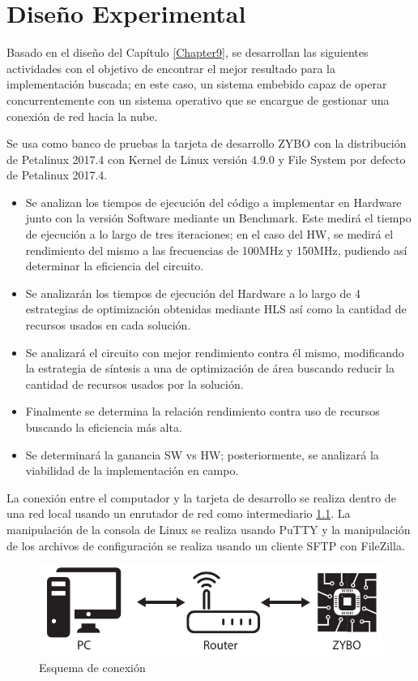 
\chapter{Diseño Experimental} %
\label{Chapter10}

Basado en el diseño del Capítulo \ref{Chapter9}, se desarrollan las siguientes actividades con el objetivo de encontrar el mejor resultado para la implementación buscada; en este caso, un sistema embebido capaz de operar concurrentemente con un sistema operativo que se encargue de gestionar una conexión de red hacia la nube.

Se usa como banco de pruebas la tarjeta de desarrollo ZYBO con la distribución de Petalinux 2017.4 con Kernel de Linux versión 4.9.0 y File System por defecto de Petalinux 2017.4.
 
 \begin{itemize}
 
  \item Se analizan los tiempos de ejecución del código a implementar en Hardware junto con la versión Software mediante un Benchmark. Este medirá el tiempo de ejecución a lo largo de tres iteraciones; en el caso del HW, se medirá el rendimiento del mismo a las frecuencias de 100MHz y 150MHz, pudiendo así determinar la eficiencia del circuito.
 
 \item Se analizarán los tiempos de ejecución del Hardware a lo largo de 4 estrategias de optimización obtenidas mediante HLS así como la cantidad de recursos usados en cada solución.
 
 \item Se analizará el circuito con mejor rendimiento contra él mismo, modificando la estrategia de síntesis a una de optimización de área buscando reducir la cantidad de recursos usados por la solución.
 
 \item Finalmente se determina la relación rendimiento contra uso de recursos buscando la eficiencia más alta.
 
 \item Se determinará la ganancia SW vs HW; posteriormente, se analizará la viabilidad de la implementación en campo.
 
 \end{itemize}
 
La conexión entre el computador y la tarjeta de desarrollo se realiza dentro de una red local usando un enrutador de red como intermediario \ref{fig:router}. La manipulación de la consola de Linux se realiza usando PuTTY y la manipulación de los archivos de configuración se realiza usando un cliente SFTP con FileZilla. 

\begin{figure}[H]
	\centering
		\includegraphics[scale=1]{./Figures/router.pdf}
	\caption{Esquema de conexión}
	\label{fig:router}
\end{figure}
